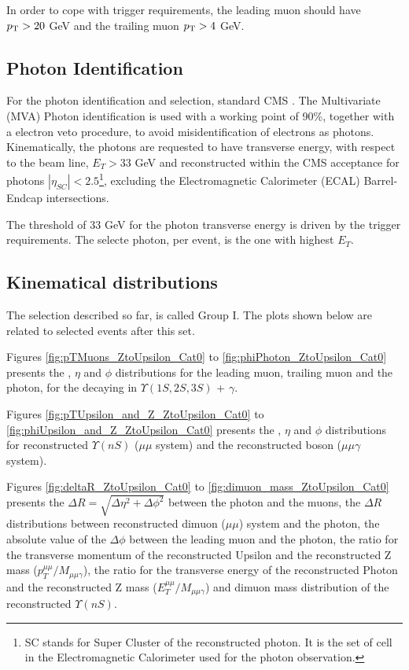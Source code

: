 In order to cope with trigger requirements, the leading muon should have $p_{\mathrm{T}} > 20$ GeV and the trailing muon $p_{\mathrm{T}} > 4$ GeV.


\subsection{Photon Identification}
\label{sec:photon_id}

For the photon identification and selection, standard CMS . The Multivariate (MVA) Photon identification is used with a working point of 90\%, together with a electron veto procedure, to avoid misidentification of electrons as photons. Kinematically, the photons are requested to have transverse energy, with respect to the beam line, $E_{T} > 33$ GeV and reconstructed within the CMS acceptance for photons $|\eta_{SC}| < 2.5$\footnote{SC stands for Super Cluster of the reconstructed photon. It is the set of cell in the Electromagnetic Calorimeter used for the photon observation.}, excluding the Electromagnetic Calorimeter (ECAL) Barrel-Endcap intersections.

The threshold of 33 GeV for the photon transverse energy is driven by the trigger requirements. The selecte photon, per event, is the one with highest $E_{T}$.


\subsection{Kinematical distributions}
\label{sec:kin_plots_group_1}

The selection described so far, is called Group I. The plots shown below are related to selected events after this set. 

Figures \ref{fig:pTMuons_ZtoUpsilon_Cat0} to \ref{fig:phiPhoton_ZtoUpsilon_Cat0} presents the \PT, $\eta$ and $\phi$ distributions for the leading muon, trailing muon and the photon, for the \Z decaying in $\Upsilon(1S,2S,3S)$ + $\gamma$. 

Figures \ref{fig:pTUpsilon_and_Z_ZtoUpsilon_Cat0} to \ref{fig:phiUpsilon_and_Z_ZtoUpsilon_Cat0} presents the \PT, $\eta$ and $\phi$ distributions for reconstructed $\Upsilon(nS)$ ($\mu\mu$ system) and the reconstructed boson ($\mu\mu\gamma$ system).

Figures \ref{fig:deltaR_ZtoUpsilon_Cat0} to \ref{fig:dimuon_mass_ZtoUpsilon_Cat0} presents the $\Delta R = \sqrt{\Delta\eta^2 + \Delta\phi^2}$ between the photon and the muons, the $\Delta R$ distributions between reconstructed dimuon ($\mu\mu$) system and the photon, the absolute value of the $\Delta \phi$ between the leading muon and the photon, the ratio for the transverse momentum of the reconstructed Upsilon and the reconstructed Z mass ($p_{T}^{\mu\mu}/M_{\mu\mu\gamma}$), the ratio for the transverse energy of the reconstructed Photon and the reconstructed Z mass ($E_{T}^{\mu\mu}/M_{\mu\mu\gamma}$) and dimuon mass distribution of the reconstructed $\Upsilon(nS)$.

